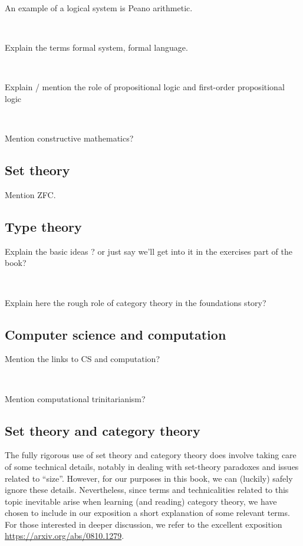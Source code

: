 An example of a logical system is Peano arithmetic.

\

Explain the terms formal system, formal language.

\

Explain / mention the role of propositional logic and first-order propositional logic

\

Mention constructive mathematics?

\subsection{Set theory}

Mention ZFC.

\subsection{Type theory}

Explain the basic ideas ?
or just say we'll get into it in the exercises part of the book?

\

Explain here the rough role of category theory in the foundations story?

\subsection{Computer science and computation}

Mention the links to CS and computation?

\

Mention computational trinitarianism?

\subsection{Set theory and category theory}

The fully rigorous use of set theory and category theory does involve taking care of some technical details, notably in dealing with set-theory paradoxes and issues related to ``size''.
However, for our purposes in this book, we can (luckily) safely ignore these details.
Nevertheless, since terms and technicalities related to this topic inevitable arise when learning (and reading) category theory, we have chosen to include in our exposition a short explanation of some relevant terms.
For those interested in deeper discussion, we refer to the excellent exposition \url{https://arxiv.org/abs/0810.1279}.


